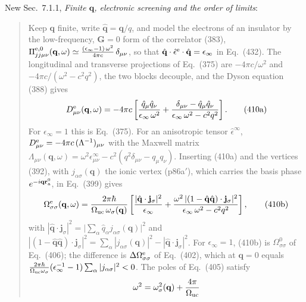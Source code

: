 \documentclass[11pt]{article}
\begin{document}
\noindent New Sec.~7.1.1, \emph{Finite $\mathbf q$, electronic screening and the order of limits}:
\begin{quote}
Keep $\mathbf q$ finite, write $\hat{\mathbf q}=\mathbf q/q$, and model the electrons of an insulator by the
low-frequency, $\mathbf G=0$ form of the correlator (383),
$\Pi^{\rm e,0}_{jj\mu\nu}(\mathbf q,\omega)\simeq\frac{(\epsilon_\infty-1)\,\omega^2}{4\pi c}\,\delta_{\mu\nu}$, so
that $\hat{\mathbf q}\cdot\hat\epsilon^{\rm e}\cdot\hat{\mathbf q}=\epsilon_\infty$ in Eq.~(432). The longitudinal
and transverse projections of Eq.~(375) are $-4\pi c/\omega^2$ and $-4\pi c/(\omega^2-c^2q^2)$, the two
blocks decouple, and the Dyson equation (388) gives
\begin{equation*}
D^{\rm e}_{\mu\nu}(\mathbf q,\omega)=-4\pi c\left[\frac{\hat q_\mu\hat q_\nu}{\epsilon_\infty\,\omega^2}
+\frac{\delta_{\mu\nu}-\hat q_\mu\hat q_\nu}{\epsilon_\infty\,\omega^2-c^2q^2}\right].
\tag{410a}
\end{equation*}
For $\epsilon_\infty=1$ this is Eq.~(375). For an anisotropic tensor $\hat\epsilon^\infty$,
$D^{\rm e}_{\mu\nu}=-4\pi c\,(\Lambda^{-1})_{\mu\nu}$ with the Maxwell matrix
$\Lambda_{\mu\nu}(\mathbf q,\omega)=\omega^2\epsilon^\infty_{\mu\nu}-c^2(q^2\delta_{\mu\nu}-q_\mu q_\nu)$.
Inserting (410a) and the vertices (392), with $j_{\alpha\sigma}(\mathbf q)$ the ionic vertex (p86a$'$), which
carries the basis phase $e^{-i\mathbf q\mathbf r^0_{\rm a}}$, in Eq.~(399) gives
\begin{equation*}
\Omega^{\rm e}_{\sigma\sigma}(\mathbf q,\omega)=\frac{2\pi\hbar}{\Omega_{\rm uc}\,\omega_\sigma(\mathbf q)}
\left[\frac{|\hat{\mathbf q}\cdot\mathbf j_\sigma|^2}{\epsilon_\infty}
+\frac{\omega^2\,|(1-\hat{\mathbf q}\hat{\mathbf q})\cdot\mathbf j_\sigma|^2}{\epsilon_\infty\,\omega^2-c^2q^2}\right],
\tag{410b}
\end{equation*}
with $|\hat{\mathbf q}\cdot\mathbf j_\sigma|^2=\big|\sum_\alpha\hat q_\alpha j_{\alpha\sigma}(\mathbf q)\big|^2$ and
$|(1-\hat{\mathbf q}\hat{\mathbf q})\cdot\mathbf j_\sigma|^2=\sum_\alpha|j_{\alpha\sigma}(\mathbf q)|^2
-|\hat{\mathbf q}\cdot\mathbf j_\sigma|^2$. For $\epsilon_\infty=1$, (410b) is $\Omega^0_{\sigma\sigma}$ of
Eq.~(406); the difference is $\Delta\Omega^{\rm e}_{\sigma\sigma}$ of Eq.~(402), which at $\mathbf q=0$ equals
$\frac{2\pi\hbar}{\Omega_{\rm uc}\omega_\sigma}(\epsilon_\infty^{-1}-1)\sum_\alpha|j_{\alpha\sigma}|^2<0$. The poles
of Eq.~(405) satisfy
\begin{equation*}
\omega^2=\omega^2_\sigma(\mathbf q)+\frac{4\pi}{\Omega_{\rm uc}}

\end{equation*}
\end{quote}
\end{document}
